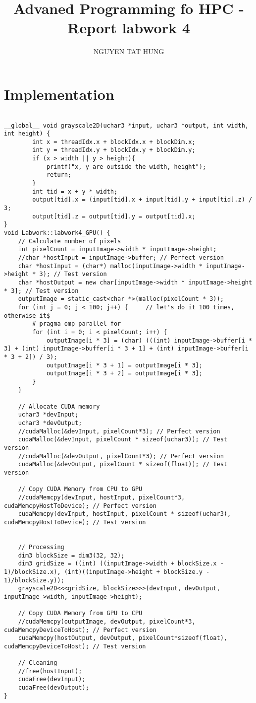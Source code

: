 \documentclass{article}
\title{Advaned Programming fo HPC - Report labwork 4}
\author{NGUYEN TAT HUNG}
\begin{document}
\maketitle

\section*{Implementation}
\begin{lstlisting}

__global__ void grayscale2D(uchar3 *input, uchar3 *output, int width, int height) {
        int x = threadIdx.x + blockIdx.x + blockDim.x;
        int y = threadIdx.y + blockIdx.y + blockDim.y;
        if (x > width || y > height){
            printf("x, y are outside the width, height");
            return;
        }
        int tid = x + y * width;
        output[tid].x = (input[tid].x + input[tid].y + input[tid].z) / 3;
        output[tid].z = output[tid].y = output[tid].x;
}
void Labwork::labwork4_GPU() {
    // Calculate number of pixels
    int pixelCount = inputImage->width * inputImage->height;
    //char *hostInput = inputImage->buffer; // Perfect version
    char *hostInput = (char*) malloc(inputImage->width * inputImage->height * 3); // Test version
    char *hostOutput = new char[inputImage->width * inputImage->height * 3]; // Test version
    outputImage = static_cast<char *>(malloc(pixelCount * 3));
    for (int j = 0; j < 100; j++) {     // let's do it 100 times, otherwise it$
        # pragma omp parallel for
        for (int i = 0; i < pixelCount; i++) {
            outputImage[i * 3] = (char) (((int) inputImage->buffer[i * 3] + (int) inputImage->buffer[i * 3 + 1] + (int) inputImage->buffer[i * 3 + 2]) / 3);
            outputImage[i * 3 + 1] = outputImage[i * 3];
            outputImage[i * 3 + 2] = outputImage[i * 3];
        }
    }

    // Allocate CUDA memory
    uchar3 *devInput;
    uchar3 *devOutput;
    //cudaMalloc(&devInput, pixelCount*3); // Perfect version
    cudaMalloc(&devInput, pixelCount * sizeof(uchar3)); // Test version
    //cudaMalloc(&devOutput, pixelCount*3); // Perfect version
    cudaMalloc(&devOutput, pixelCount * sizeof(float)); // Test version
    
    // Copy CUDA Memory from CPU to GPU
    //cudaMemcpy(devInput, hostInput, pixelCount*3, cudaMemcpyHostToDevice); // Perfect version
    cudaMemcpy(devInput, hostInput, pixelCount * sizeof(uchar3), cudaMemcpyHostToDevice); // Test version


    // Processing
    dim3 blockSize = dim3(32, 32);
    dim3 gridSize = ((int) ((inputImage->width + blockSize.x - 1)/blockSize.x), (int)((inputImage->height + blockSize.y - 1)/blockSize.y));
    grayscale2D<<<gridSize, blockSize>>>(devInput, devOutput, inputImage->width, inputImage->height);

    // Copy CUDA Memory from GPU to CPU
    //cudaMemcpy(outputImage, devOutput, pixelCount*3, cudaMemcpyDeviceToHost); // Perfect version
    cudaMemcpy(hostOutput, devOutput, pixelCount*sizeof(float), cudaMemcpyDeviceToHost); // Test version

    // Cleaning
    //free(hostInput);
    cudaFree(devInput);
    cudaFree(devOutput);
}

\end{lstlisting}
\end{document}
